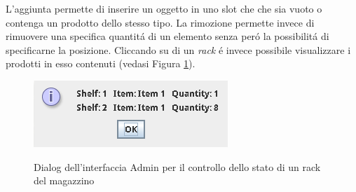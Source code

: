 L'aggiunta permette di inserire un oggetto in uno slot che che sia vuoto o contenga un prodotto dello stesso tipo. La rimozione permette invece di rimuovere una specifica quantit\'a di un elemento senza per\'o la possibilit\'a di specificarne la posizione.
Cliccando su di un \textit{rack} \'e invece possibile visualizzare i prodotti in esso contenuti (vedasi Figura \ref{fig:application-rack}).
\begin{figure}
    \includegraphics[width=\textwidth]{section/usage_examples/figure/application-rack.png}
    \label{fig:application-rack}
    \caption{Dialog dell'interfaccia Admin per il controllo dello stato di un rack del magazzino}
\end{figure}

